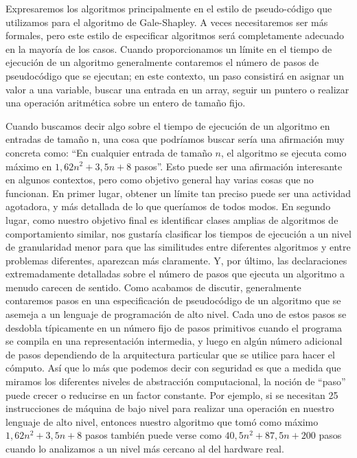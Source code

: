 \documentclass[a4paper, 12pt]{book}
\begin{document}
Expresaremos los algoritmos principalmente en el estilo de pseudo-código que utilizamos para el algoritmo de Gale-Shapley. A veces necesitaremos ser más formales, pero este estilo de especificar algoritmos será completamente adecuado en la mayoría de los casos. Cuando proporcionamos un límite en el tiempo de ejecución de un algoritmo generalmente contaremos el número de pasos de pseudocódigo que se ejecutan; en este contexto, un paso consistirá en asignar un valor a una
variable, buscar una entrada en un array, seguir un puntero o realizar una operación aritmética sobre un entero de tamaño fijo.

Cuando buscamos decir algo sobre el tiempo de ejecución de un algoritmo en entradas de tamaño n, una cosa que podríamos buscar sería una afirmación muy concreta como: ``En cualquier entrada de tamaño $n$, el algoritmo se ejecuta como máximo en $1,62n^2 +3,5n + 8$ pasos''. Esto puede ser una afirmación interesante en algunos contextos, pero como objetivo general hay varias cosas que no funcionan. 
En primer lugar, obtener un límite tan preciso puede ser una actividad agotadora, y más detallada de lo que queríamos de todos modos.
En segundo lugar, como nuestro objetivo final es identificar clases amplias de algoritmos de
comportamiento similar, nos gustaría clasificar los tiempos de ejecución a un nivel de granularidad menor para que las similitudes entre diferentes algoritmos y entre
problemas diferentes, aparezcan más claramente. Y, por último, las declaraciones extremadamente detalladas sobre el número de pasos que ejecuta un algoritmo a menudo carecen de sentido. Como acabamos de discutir, generalmente contaremos pasos en una especificación de pseudocódigo de un algoritmo que se asemeja a un lenguaje de programación de alto nivel. Cada uno de estos pasos se desdobla típicamente en un número fijo de pasos primitivos cuando el programa se compila en una representación intermedia, y luego en algún número adicional de pasos dependiendo de la arquitectura particular que se utilice para hacer el cómputo. Así que lo más que podemos decir con seguridad es que a medida que miramos los diferentes niveles de abstracción computacional, la noción de ``paso'' puede crecer o reducirse en un factor constante.
Por ejemplo, si se necesitan 25 instrucciones de máquina de bajo nivel para realizar una operación en nuestro lenguaje de alto nivel, entonces nuestro algoritmo que tomó como máximo $1,62n^2 +3,5n + 8$ pasos también puede verse como $40,5n^2 + 87,5n + 200$ pasos cuando lo analizamos a un nivel más cercano al del hardware real.
\end{document}
